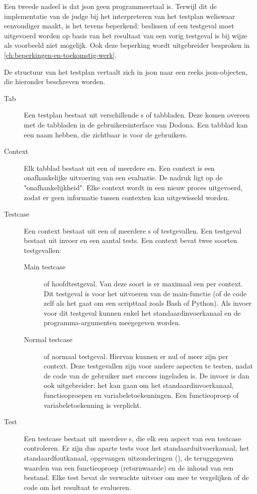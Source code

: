 Een tweede nadeel is dat json geen programmeertaal is.
Terwijl dit de implementatie van de judge bij het interpreteren van het testplan weliswaar eenvoudiger maakt, is het tevens beperkend: beslissen of een testgeval moet uitgevoerd worden op basis van het resultaat van een vorig testgeval is bij wijze als voorbeeld niet mogelijk.
Ook deze beperking wordt uitgebreider besproken in \cref{ch:beperkingen-en-toekomstig-werk}.

De structuur van het testplan vertaalt zich in json naar een reeks json-objecten, die hieronder beschreven worden.

\begin{description}
    \item[Tab] Een testplan bestaat uit verschillende s of tabbladen.
    Deze komen overeen met de tabbladen in de gebruikersinterface van Dodona.
    Een tabblad kan een naam hebben, die zichtbaar is voor de gebruikers.
    \item[Context] Elk tabblad bestaat uit een of meerdere en.
    Een context is een onafhankelijke uitvoering van een evaluatie.
    De nadruk ligt op de "onafhankelijkheid".
    Elke context wordt in een nieuw proces uitgevoerd, zodat er geen informatie tussen contexten kan uitgewisseld worden.
    \item[Testcase] Een context bestaat uit een of meerdere s of testgevallen.
    Een testgeval bestaat uit invoer en een aantal tests.
    Een context bevat twee soorten testgevallen:
    \begin{description}
        \item[Main testcase] of hoofdtestgeval.
        Van deze soort is er maximaal een per context.
        Dit testgeval is voor het uitvoeren van de main-functie (of de code zelf als het gaat om een scripttaal zoals Bash of Python).
        Als invoer voor dit testgeval kunnen enkel het standaardinvoerkanaal en de programma-argumenten meegegeven worden.
        \item[Normal testcase] of normaal testgeval.
        Hiervan kunnen er nul of meer zijn per context.
        Deze testgevallen zijn voor andere aspecten te testen, nadat de code van de gebruiker met success ingeladen is.
        De invoer is dan ook uitgebreider: het kan gaan om het standaardinvoerkanaal, functieoproepen en variabeletoekenningen.
        Een functieoproep of variabeletoekenning is verplicht.
    \end{description}
    \item[Test] Een testcase bestaat uit meerdere s, die elk een aspect van een testcase controleren.
    Er zijn dus aparte tests voor het standaarduitvoerkanaal, het standaardfoutkanaal, opgevangen uitzonderingen (), de teruggegeven waarden van een functieoproep (returnwaarde) en de inhoud van een bestand.
    Elke test bevat de verwachte uitvoer om mee te vergelijken of de code om het resultaat te evalueren.
\end{description}

